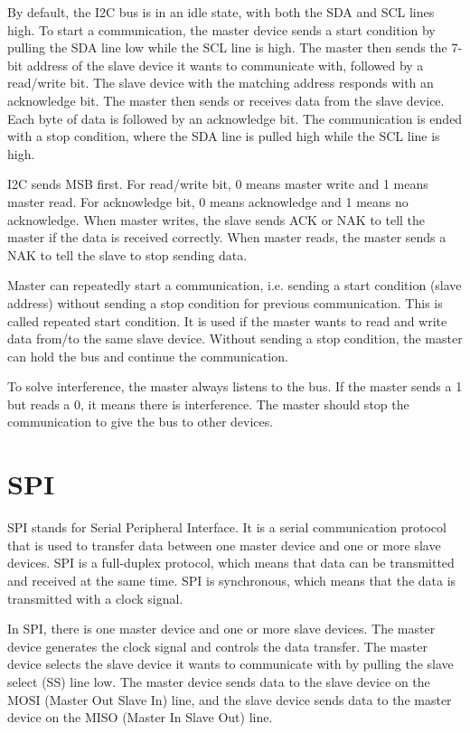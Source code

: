 \documentclass[a4paper,12pt]{article}
\begin{document}
By default, the I2C bus is in an idle state, with both the SDA and SCL lines high. To start a communication, the master device sends a start condition by pulling the SDA line low while the SCL line is high. The master then sends the 7-bit address of the slave device it wants to communicate with, followed by a read/write bit. The slave device with the matching address responds with an acknowledge bit. The master then sends or receives data from the slave device. Each byte of data is followed by an acknowledge bit. The communication is ended with a stop condition, where the SDA line is pulled high while the SCL line is high.

I2C sends MSB first. For read/write bit, 0 means master write and 1 means master read. For acknowledge bit, 0 means acknowledge and 1 means no acknowledge. When master writes, the slave sends ACK or NAK to tell the master if the data is received correctly. When master reads, the master sends a NAK to tell the slave to stop sending data.

Master can repeatedly start a communication, i.e. sending a start condition (slave address) without sending a stop condition for previous communication. This is called repeated start condition. It is used if the master wants to read and write data from/to the same slave device. Without sending a stop condition, the master can hold the bus and continue the communication.

To solve interference, the master always listens to the bus. If the master sends a 1 but reads a 0, it means there is interference. The master should stop the communication to give the bus to other devices.

\section{SPI}

SPI stands for Serial Peripheral Interface. It is a serial communication protocol that is used to transfer data between one master device and one or more slave devices. SPI is a full-duplex protocol, which means that data can be transmitted and received at the same time. SPI is synchronous, which means that the data is transmitted with a clock signal.

In SPI, there is one master device and one or more slave devices. The master device generates the clock signal and controls the data transfer. The master device selects the slave device it wants to communicate with by pulling the slave select (SS) line low. The master device sends data to the slave device on the MOSI (Master Out Slave In) line, and the slave device sends data to the master device on the MISO (Master In Slave Out) line.
\end{document}
